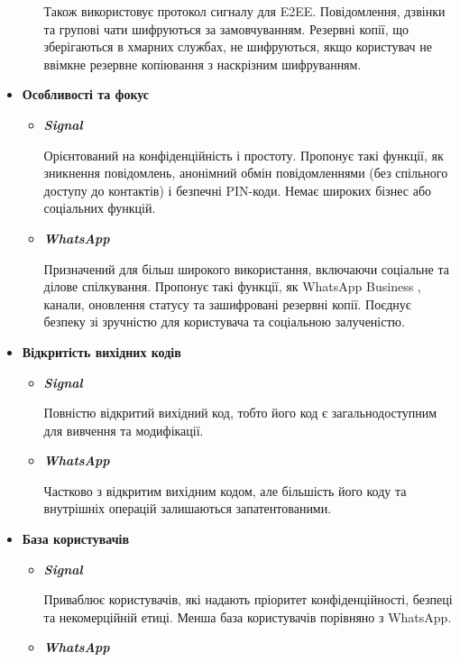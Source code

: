 \begin{itemize}
\begin{itemize}
                Також використовує протокол сигналу для E2EE. Повідомлення, дзвінки та групові чати шифруються за замовчуванням. Резервні копії, що зберігаються в хмарних службах, не шифруються, якщо користувач не ввімкне резервне копіювання з наскрізним шифруванням.
        \end{itemize}
        
    \item \textbf{Особливості та фокус}
        \begin{itemize}
            \item \textbf{\textit{Signal}}
               
                Орієнтований на конфіденційність і простоту. Пропонує такі функції, як зникнення повідомлень, анонімний обмін повідомленнями (без спільного доступу до контактів) і безпечні PIN-коди. Немає широких бізнес або соціальних функцій.
            \item \textbf{\textit{WhatsApp}}
                
                Призначений для більш широкого використання, включаючи соціальне та ділове спілкування. Пропонує такі функції, як WhatsApp Business \cite{whatsapp_business}, канали, оновлення статусу та зашифровані резервні копії. Поєднує безпеку зі зручністю для користувача та соціальною залученістю.
        \end{itemize}
        
    \item \textbf{Відкритість вихідних кодів}
        \begin{itemize}
            \item \textbf{\textit{Signal}}
                
                Повністю відкритий вихідний код, тобто його код є загальнодоступним для вивчення та модифікації.
            \item \textbf{\textit{WhatsApp}}
                
                Частково з відкритим вихідним кодом, але більшість його коду та внутрішніх операцій залишаються запатентованими.
        \end{itemize}
        
    \item \textbf{База користувачів}
        \begin{itemize}
            \item \textbf{\textit{Signal}}
                
                Приваблює користувачів, які надають пріоритет конфіденційності, безпеці та некомерційній етиці. Менша база користувачів порівняно з WhatsApp.
            \item \textbf{\textit{WhatsApp}}
                

\end{itemize}
\end{itemize}
